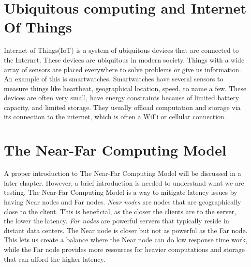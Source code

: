 
\section{Ubiquitous computing and Internet Of Things}

Internet of Things(IoT) is a system of ubiquitous devices that are connected to the Internet\cite{noauthor_what_nodate}. These devices are ubiquitous in modern society. Things with a wide array of sensors are placed everywhere to solve problems or give us information. An example of this is smartwatches. Smartwatches have several sensors to measure things like heartbeat, geographical location, speed, to name a few.  These devices are often very small, have energy constraints because of limited battery capacity, and limited storage. They usually offload computation and storage via its connection to the internet, which is often a WiFi or cellular connection. 






\section{The Near-Far Computing Model}
A proper introduction to The Near-Far Computing Model will be discussed in a later chapter. However, a brief introduction is needed to understand what we are testing. The Near-Far Computing Model is a way to mitigate latency issues by having Near nodes and Far nodes. \textit{Near nodes} are nodes that are geographically close to the client. This is beneficial, as the closer the clients are to the server, the lower the latency. \textit{Far nodes} are powerful servers that typically reside in distant data centers. The Near node is closer but not as powerful as the Far node. This lets us create a balance where the Near node can do low response time work, while the Far node provides more resources for heavier computations and storage that can afford the higher latency.




